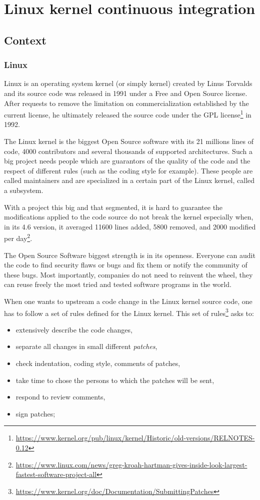 \chapter{Linux kernel continuous integration}
\section{Context}
\subsection{Linux}
Linux is an operating system kernel (or simply kernel) created by Linus Torvalds and its source code was released in 1991 under a Free and Open Source license. After requests to remove the limitation on commercialization established by the current license, he ultimately released the source code under the GPL license\footnote{\url{https://www.kernel.org/pub/linux/kernel/Historic/old-versions/RELNOTES-0.12}} in 1992.

The Linux kernel is the biggest Open Source software with its 21 millions lines of code, 4000 contributors and several thousands of supported architectures. Such a big project needs people which are guarantors of the quality of the code and the respect of different rules (such as the coding style for example). These people are called maintainers and are specialized in a certain part of the Linux kernel, called a subsystem.

With a project this big and that segmented, it is hard to guarantee the modifications applied to the code source do not break the kernel especially when, in its 4.6 version, it averaged 11600 lines added, 5800 removed, and 2000 modified per day\footnote{\url{https://www.linux.com/news/greg-kroah-hartman-gives-inside-look-largest-fastest-software-project-all}}.

The Open Source Software biggest strength is in its openness. Everyone can audit the code to find security flaws or bugs and fix them or notify the community of these bugs. Most importantly, companies do not need to reinvent the wheel, they can reuse freely the most tried and tested software programs in the world.

When one wants to upstream a code change in the Linux kernel source code, one has to follow a set of rules defined for the Linux kernel. This set of rules\footnote{\url{https://www.kernel.org/doc/Documentation/SubmittingPatches}} asks to:
\begin{itemize}
  \item extensively describe the code changes,
  \item separate all changes in small different \textit{patches},
  \item check indentation, coding style, comments of patches,
  \item take time to chose the persons to which the patches will be sent,
  \item respond to review comments,
  \item sign patches;
\end{itemize}

